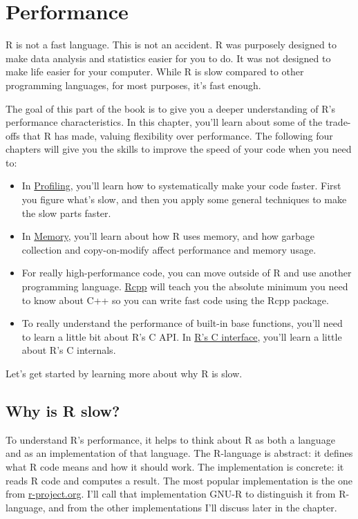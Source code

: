 \hypertarget{performance}{%
\chapter{Performance}\label{performance}}

R is not a fast language. This is not an accident. R was purposely
designed to make data analysis and statistics easier for you to do. It
was not designed to make life easier for your computer. While R is slow
compared to other programming languages, for most purposes, it's fast
enough. 

The goal of this part of the book is to give you a deeper understanding
of R's performance characteristics. In this chapter, you'll learn about
some of the trade-offs that R has made, valuing flexibility over
performance. The following four chapters will give you the skills to
improve the speed of your code when you need to:

\begin{itemize}
\item
  In \protect\hyperlink{profiling}{Profiling}, you'll learn how to
  systematically make your code faster. First you figure what's slow,
  and then you apply some general techniques to make the slow parts
  faster.
\item
  In \protect\hyperlink{memory}{Memory}, you'll learn about how R uses
  memory, and how garbage collection and copy-on-modify affect
  performance and memory usage.
\item
  For really high-performance code, you can move outside of R and use
  another programming language. \protect\hyperlink{rcpp}{Rcpp} will
  teach you the absolute minimum you need to know about C++ so you can
  write fast code using the Rcpp package.
\item
  To really understand the performance of built-in base functions,
  you'll need to learn a little bit about R's C API. In
  \protect\hyperlink{c-api}{R's C interface}, you'll learn a little
  about R's C internals.
\end{itemize}

Let's get started by learning more about why R is slow.

\hypertarget{why-is-r-slow}{%
\section{Why is R slow?}\label{why-is-r-slow}}

To understand R's performance, it helps to think about R as both a
language and as an implementation of that language. The R-language is
abstract: it defines what R code means and how it should work. The
implementation is concrete: it reads R code and computes a result. The
most popular implementation is the one from
\href{http://r-project.org}{r-project.org}. I'll call that
implementation GNU-R to distinguish it from R-language, and from the
other implementations I'll discuss later in the chapter.

